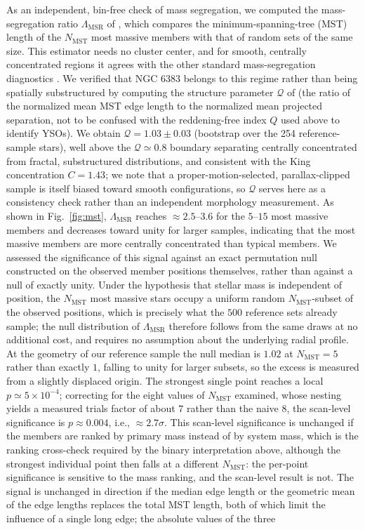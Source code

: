 \documentclass{aa}
\begin{document}
As an independent, bin-free check of mass segregation, we computed the mass-segregation ratio $\Lambda_{\mathrm{MSR}}$ of \citet{2009MNRAS.395.1449A}, which compares the minimum-spanning-tree (MST) length of the $N_{\mathrm{MST}}$ most massive members with that of random sets of the same size. This estimator needs no cluster center, and for smooth, centrally concentrated regions it agrees with the other standard mass-segregation diagnostics \citep{2015MNRAS.449.3381P}. We verified that NGC 6383 belongs to this regime rather than being spatially substructured by computing the structure parameter $\mathcal{Q}$ of \citet{2004MNRAS.348..589C} (the ratio of the normalized mean MST edge length to the normalized mean projected separation, not to be confused with the reddening-free index $Q$ used above to identify YSOs). We obtain $\mathcal{Q}=1.03\pm0.03$ (bootstrap over the 254 reference-sample stars), well above the $\mathcal{Q}\simeq0.8$ boundary separating centrally concentrated from fractal, substructured distributions, and consistent with the King concentration $C=1.43$; we note that a proper-motion-selected, parallax-clipped sample is itself biased toward smooth configurations, so $\mathcal{Q}$ serves here as a consistency check rather than an independent morphology measurement. As shown in Fig.~\ref{fig:mst}, $\Lambda_{\mathrm{MSR}}$ reaches $\approx2.5$--$3.6$ for the $5$--$15$ most massive members and decreases toward unity for larger samples, indicating that the most massive members are more centrally concentrated than typical members. We assessed the significance of this signal against an exact permutation null constructed on the observed member positions themselves, rather than against a null of exactly unity. Under the hypothesis that stellar mass is independent of position, the $N_{\mathrm{MST}}$ most massive stars occupy a uniform random $N_{\mathrm{MST}}$-subset of the observed positions, which is precisely what the $500$ reference sets already sample; the null distribution of $\Lambda_{\mathrm{MSR}}$ therefore follows from the same draws at no additional cost, and requires no assumption about the underlying radial profile. At the geometry of our reference sample the null median is $1.02$ at $N_{\mathrm{MST}}=5$ rather than exactly $1$, falling to unity for larger subsets, so the excess is measured from a slightly displaced origin. The strongest single point reaches a local $p\simeq5\times10^{-4}$; correcting for the eight values of $N_{\mathrm{MST}}$ examined, whose nesting yields a measured trials factor of about $7$ rather than the naive $8$, the scan-level significance is $p\approx0.004$, i.e., $\approx2.7\sigma$. This scan-level significance is unchanged if the members are ranked by primary mass instead of by system mass, which is the ranking cross-check required by the binary interpretation above, although the strongest individual point then falls at a different $N_{\mathrm{MST}}$: the per-point significance is sensitive to the mass ranking, and the scan-level result is not. The signal is unchanged in direction if the median edge length \citep{2011MNRAS.416..541M} or the geometric mean of the edge lengths \citep{2011A&A...532A.119O} replaces the total MST length, both of which limit the influence of a single long edge; the absolute values of the three 
\end{document}
